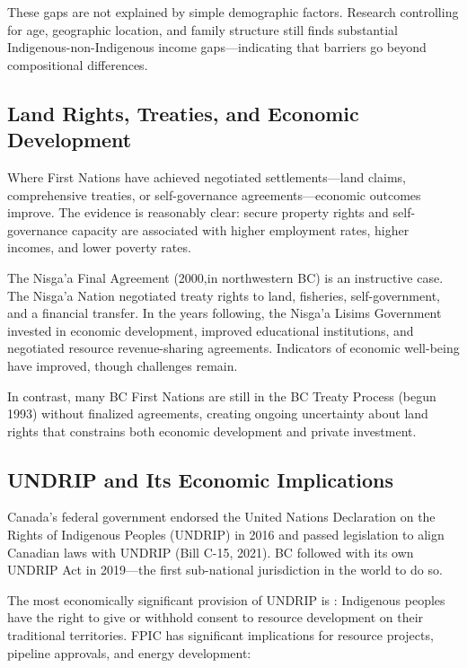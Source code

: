 These gaps are not explained by simple demographic factors. Research controlling for age, geographic location, and family structure still finds substantial Indigenous-non-Indigenous income gaps---indicating that barriers go beyond compositional differences.

\subsection{Land Rights, Treaties, and Economic Development}

Where First Nations have achieved negotiated settlements---land claims, comprehensive treaties, or self-governance agreements---economic outcomes improve. The evidence is reasonably clear: secure property rights and self-governance capacity are associated with higher employment rates, higher incomes, and lower poverty rates.

The Nisga'a Final Agreement (2000,in northwestern BC) is an instructive case. The Nisga'a Nation negotiated treaty rights to land, fisheries, self-government, and a financial transfer. In the years following, the Nisga'a Lisims Government invested in economic development, improved educational institutions, and negotiated resource revenue-sharing agreements. Indicators of economic well-being have improved, though challenges remain.

In contrast, many BC First Nations are still in the BC Treaty Process (begun 1993) without finalized agreements, creating ongoing uncertainty about land rights that constrains both economic development and private investment.

\subsection{UNDRIP and Its Economic Implications}

Canada's federal government endorsed the United Nations Declaration on the Rights of Indigenous Peoples (UNDRIP) in 2016 and passed legislation to align Canadian laws with UNDRIP (Bill C-15, 2021). BC followed with its own UNDRIP Act in 2019---the first sub-national jurisdiction in the world to do so.

The most economically significant provision of UNDRIP is : Indigenous peoples have the right to give or withhold consent to resource development on their traditional territories. FPIC has significant implications for resource projects, pipeline approvals, and energy development:

